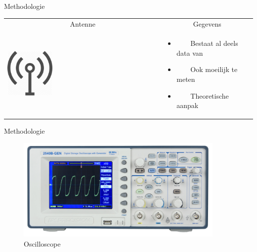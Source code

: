\documentclass[presentation, bigger]{beamer}
\newcommand{\tabitem}{~~\llap{\textbullet}~~}
\begin{document}
\begin{frame}{Methodologie}
 
     \begin{tabular}{ p{}  p{}   }
     \toprule
      \multicolumn{1}{c}{Antenne} &      \multicolumn{1}{c}{Gegevens}  \\ 
    \cmidrule(r){1-1}\cmidrule(lr){2-2}
     \raisebox{-\totalheight}
{\includegraphics[width=0.3\textwidth,keepaspectration=true]{radio}}
      & 
      \begin{itemize}
      \item \tabitem Bestaat al deels data van
      \item \tabitem Ook moeilijk te meten
      \item \tabitem Theoretische aanpak
      \end{itemize}
      \\ 
      
      \end{tabular}
     
\end{frame}


\begin{frame}{Methodologie}
  \begin{figure}[center]
    \centering
    \includegraphics[width=0.9\textwidth,keepaspectration=true]{elek/dso}
    \caption{Oscilloscope}
  \end{figure}
\end{frame}
\end{document}
